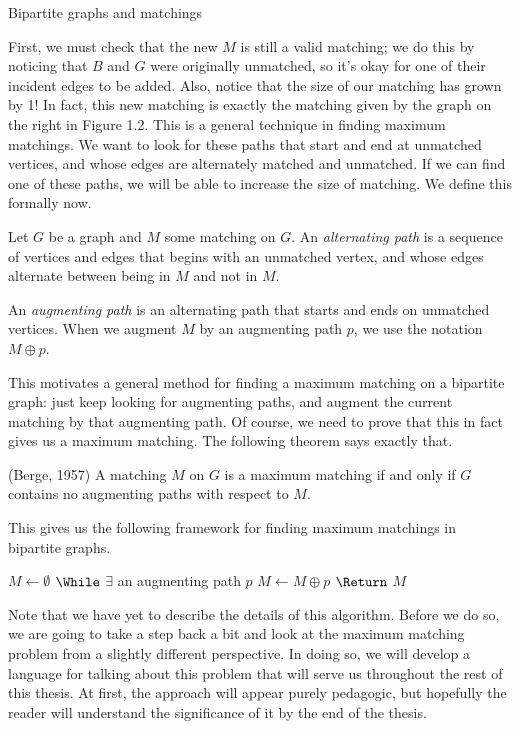 \begin{section}{Bipartite graphs and matchings}
\begin{figure}[h]
	\end{figure}
	First, we must check that the new $M$ is still a valid matching; we do this by noticing that 
	$B$ and $G$ were originally unmatched, so it's okay for one of their incident edges to be 
	added. Also, notice that the size of our matching has grown by 1! In fact, this new matching 
	is exactly the matching given by the graph on the right in Figure 1.2. 
	This is a general technique in 
	finding maximum matchings. We want to look for these paths that start and end at unmatched 
	vertices, and whose edges are alternately matched and unmatched. If we can find one of these 
	paths, we will be able to increase the size of matching. We define this formally now.
	\begin{definition}
		Let $G$ be a graph and $M$ some matching on $G$. An \emph{alternating path} is a 
		sequence of vertices and edges that begins with an unmatched vertex, and whose 
		edges alternate between being in $M$ and not in $M$.
	\end{definition}
	\begin{definition}
		An \emph{augmenting path} is an alternating path that starts and ends on unmatched 
		vertices. When we augment $M$ by an augmenting path $p$, we use the notation 
		$M\oplus p$.
	\end{definition}
	This motivates a general method for finding a maximum matching on a bipartite graph: 
	just keep looking for augmenting paths, and augment the current matching by that augmenting 
	path. Of course, we need to prove that this in fact gives us a maximum matching. The following 
	theorem says exactly that.
	\begin{theorem}{(Berge, 1957)}
		A matching $M$ on $G$ is a maximum matching if and only if $G$ contains no augmenting 
		paths with respect to $M$.
	\end{theorem}
	This gives us the following framework for finding maximum matchings in bipartite graphs.
		\begin{codebox}
			\li $M \gets \emptyset $
			\li $\While$ $\exists$ an augmenting path $p$
				\Do
			\li		$M \gets M\oplus p$
				\End
			\li $\Return$ $M$
		\end{codebox}
	Note that we have yet to describe the details of this algorithm. Before we do so, we are going 
	to take a step back a bit and look at the maximum matching problem from a slightly different 
	perspective. In doing so, we will develop a language for talking about this problem that will 
	serve us throughout the rest of this thesis. At first, the approach will appear purely 
	pedagogic, but hopefully the reader will understand the significance of it by the end of the 
	thesis.
\end{section}

